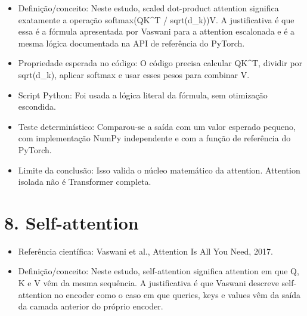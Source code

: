 \begin{itemize}
\item Definição/conceito:
Neste estudo, scaled dot-product attention significa exatamente a operação
softmax(QK\textasciicircum{}T / sqrt(d\_\allowbreak{}k))V. A justificativa é que essa é a fórmula apresentada
por Vaswani para a attention escalonada e é a mesma lógica documentada na API
de referência do PyTorch.
\end{itemize}

\begin{itemize}
\item Propriedade esperada no código:
O código precisa calcular QK\textasciicircum{}T, dividir por sqrt(d\_\allowbreak{}k), aplicar softmax e usar
esses pesos para combinar V.
\end{itemize}

\begin{itemize}
\item Script Python:
Foi usada a lógica literal da fórmula, sem otimização escondida.
\end{itemize}

\begin{itemize}
\item Teste determinístico:
Comparou-se a saída com um valor esperado pequeno, com implementação NumPy
independente e com a função de referência do PyTorch.
\end{itemize}

\begin{itemize}
\item Limite da conclusão:
Isso valida o núcleo matemático da attention. Attention isolada não é
Transformer completa.
\end{itemize}



\section{8. Self-attention}


\begin{itemize}
\item Referência científica:
Vaswani et al., Attention Is All You Need, 2017.
\end{itemize}

\begin{itemize}
\item Definição/conceito:
Neste estudo, self-attention significa attention em que Q, K e V vêm da mesma
sequência. A justificativa é que Vaswani descreve self-attention no encoder
como o caso em que queries, keys e values vêm da saída da camada anterior do
próprio encoder.
\end{itemize}

